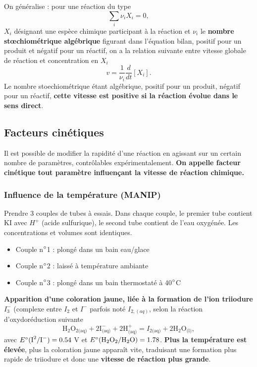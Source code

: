 \documentclass[11pt,a4paper]{report}
\begin{document}
On généralise : pour une réaction du type
\begin{equation}
	\sum_i \nu_i X_i = 0,
\end{equation}
$X_i$ désignant une espèce chimique participant à la réaction et $\nu_i$ le \textbf{nombre stœchiométrique algébrique} figurant dans l'équation bilan, positif pour un produit et négatif pour un réactif, on a la relation suivante entre vitesse globale de réaction et concentration en $X_i$
\begin{equation}
	\boxed{v = \frac{1}{\nu_i}\frac{d}{dt}[X_i]}.
\end{equation}
Le nombre stoechiométrique étant algébrique, positif pour un produit, négatif pour un réactif, \textbf{cette vitesse est positive si la réaction évolue dans le sens direct}.

\subsection{Facteurs cinétiques}

Il est possible de modifier la rapidité d'une réaction en agissant sur un certain nombre de paramètres, contrôlables expérimentalement. \textbf{On appelle facteur cinétique tout paramètre influençant la vitesse de réaction chimique.}

\subsubsection{Influence de la température (MANIP)}

Prendre 3 couples de tubes à essais. Dans chaque couple, le premier tube contient KI avec $H^+$ (acide sulfurique), le second tube contient de l'eau oxygénée. Les concentrations et volumes sont identiques.
\begin{itemize}
	\item Couple n$\degree$1 : plongé dans un bain eau/glace
	 
	\item Couple n$\degree$2 : laissé à température ambiante
	
	\item Couple n$\degree$3 : plongé dans un bain thermostaté à 40$\degree$C
\end{itemize}

\textbf{Apparition d'une coloration jaune, liée à la formation de l'ion triiodure $I_3^-$} (complexe entre $I_2$ et $I^-$ parfois noté $I_{2,(aq)}$, selon la réaction d'oxydoréduction suivante
\begin{equation}
\boxed{\text{H}_2\text{O}_{2\text{(aq)}} + 2 \text{I}^{-}_\text{(aq)} + 2 \text{H}^+_\text{(aq)} 
= I_{2\text{(aq)}} + 2\text{H}_2\text{O}_\text{(l)}},
\end{equation}
avec $E\degree(\text{I}^2/\text{I}^-) = 0.54$ V et $E\degree(\text{H}_2\text{O}_{2}/\text{H}_2\text{O}) = 1.78$. \textbf{Plus la température est élevée}, plus la coloration jaune apparaît vite, traduisant une formation plus rapide de triiodure et donc une \textbf{vitesse de réaction plus grande}.
\end{document}

